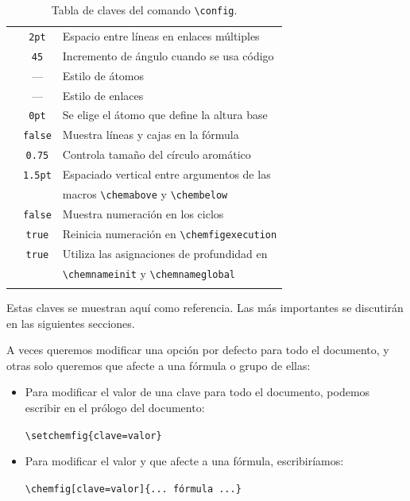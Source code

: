 {\begin{center}
\begin{longtable}{rcl}
    & \texttt{2pt}
    & Espacio entre líneas en enlaces múltiples\\
    \texttt{\color{Blue}{angle increment}}
    & \texttt{45}
    & Incremento de ángulo cuando se usa código\\
    \texttt{\color{Blue}{node style}}
    & ---
    & Estilo de átomos\\
    \texttt{\color{Blue}{bond style}}
    & ---
    & Estilo de enlaces\\
    \texttt{\color{Blue}{baseline}}
    & \texttt{0pt}
    & Se elige el átomo que define la altura base\\
    \texttt{\color{Blue}{debug}}
    & \texttt{false}
    & Muestra líneas y cajas en la fórmula\\
    \texttt{\color{Blue}{cycle radius coeff}}
    & \texttt{0.75}
    & Controla tamaño del círculo aromático\\
    \texttt{\color{Blue}{stack sep}}
    & \texttt{1.5pt}
    & Espaciado vertical entre argumentos de las\\&& macros \texttt{\textbackslash chemabove} y \texttt{\textbackslash chembelow}\\
    \texttt{\color{Blue}{show cntcycle}}
    & \texttt{false}
    & Muestra numeración en los ciclos\\
    \texttt{\color{Blue}{autoreset cntcycle}}
    & \texttt{true}
    & Reinicia numeración en \texttt{\textbackslash chemfigexecution}\\
    \texttt{\color{Blue}{gchemname}}
    & \texttt{true}
    & Utiliza las asignaciones de profundidad en \\&& \texttt{\textbackslash chemnameinit} y \texttt{\textbackslash chemnameglobal}\\
    \hline
    \caption{Tabla de claves del comando \texttt{\backslash config}.}
  \end{longtable}
\end{center}
}

\vspace{-5ex}
Estas claves se muestran aquí como referencia. Las más importantes se discutirán en las
siguientes secciones.

A veces queremos modificar una opción por defecto para todo el documento, y otras
solo queremos que afecte a una fórmula o grupo de ellas:
\begin{itemize}
\item Para modificar el valor de una clave para todo el documento, podemos
  escribir en el prólogo del documento:
  \begin{center}
    \texttt{\textbackslash setchemfig\{clave=valor\}}
  \end{center}
  \item Para modificar el valor y que afecte a una fórmula, escribiríamos:
    \begin{center}
      \texttt{\textbackslash chemfig[clave=valor]\{... fórmula ...\}}
    \end{center}
\end{itemize}

